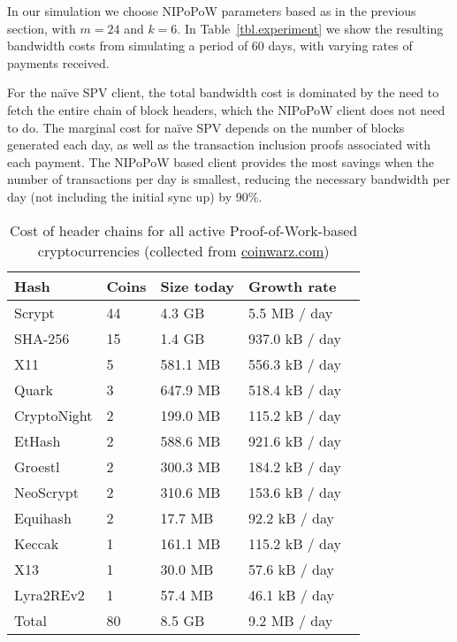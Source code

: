  In our simulation we choose NIPoPoW parameters based as in the previous section, with $m=24$ and $k=6$.
In Table~\ref{tbl.experiment} we show the resulting bandwidth costs from simulating a period of 60 days, with varying rates of payments received.

 For the na\"ive SPV client, the total bandwidth cost is dominated by the need to fetch the entire chain of block headers, which the NIPoPoW client does not need to do. The marginal cost for na\"ive SPV depends on the number of blocks generated each day, as well as the transaction inclusion proofs associated with each payment. The NIPoPoW based client provides the most savings when the number of transactions per day is smallest, reducing the necessary bandwidth per day (not including the initial sync up) by 90\%.

\begin{table}
  \caption{Cost of header chains for all active Proof-of-Work-based cryptocurrencies (collected from \url{coinwarz.com})}
  \label{tbl.currencies}
  \small
  \centering
  \begin{tabular}{l|l|l|l}
    {\bf Hash} & {\bf Coins} & {\bf Size today} & {\bf Growth rate}  \\
    \hline
    Scrypt  & 44  & 4.3 GB  & 5.5 MB / day \  \\
    SHA-256  & 15  & 1.4 GB  & 937.0 kB / day \  \\
    X11  & 5  & 581.1 MB  & 556.3 kB / day \  \\
    Quark  & 3  & 647.9 MB  & 518.4 kB / day \  \\
    CryptoNight  & 2  & 199.0 MB  & 115.2 kB / day \  \\
    EtHash  & 2  & 588.6 MB  & 921.6 kB / day \  \\
    Groestl  & 2  & 300.3 MB  & 184.2 kB / day \  \\
    NeoScrypt  & 2  & 310.6 MB  & 153.6 kB / day \  \\
    Equihash  & 2  & 17.7 MB  & 92.2 kB / day \  \\
    Keccak  & 1  & 161.1 MB  & 115.2 kB / day \  \\
    X13  & 1  & 30.0 MB  & 57.6 kB / day \  \\
    Lyra2REv2  & 1  & 57.4 MB  & 46.1 kB / day \  \\
    \hline
    Total  & 80   &  8.5 GB  & 9.2 MB  / day  \\
  \end{tabular}
\end{table}



